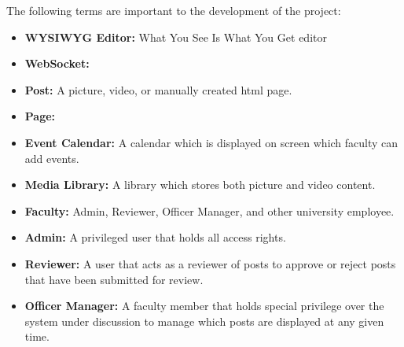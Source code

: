 The following terms are important to the development of the project:
\begin{itemize}
    \item \textbf{WYSIWYG Editor:} What You See Is What You Get editor
    \item \textbf{WebSocket:}
    \item \textbf{Post:} A picture, video, or manually created html page.
    \item \textbf{Page:}
    \item \textbf{Event Calendar:} A calendar which is displayed on screen which faculty can add events.
    \item \textbf{Media Library:} A library which stores both picture and video content.
    \item \textbf{Faculty:} Admin, Reviewer, Officer Manager, and other university employee.
    \item \textbf{Admin:} A privileged user that holds all access rights.
    \item \textbf{Reviewer:} A user that acts as a reviewer of posts to approve or reject posts that have been submitted for review.
    \item \textbf{Officer Manager:} A faculty member that holds special privilege over the system under discussion to manage which posts are displayed at any given time.
\end{itemize}